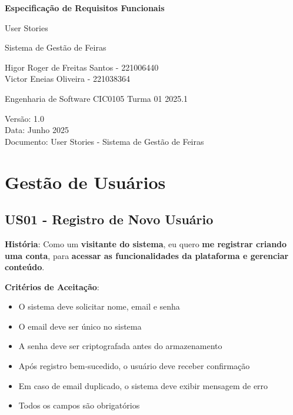 \documentclass[12pt,a4paper]{article}
\begin{document}
\begin{titlepage}
\centering
\vspace*{2cm}

{\Huge\bfseries Especificação de Requisitos Funcionais}

\vspace{0.5cm}

{\LARGE User Stories}

\vspace{0.5cm}

{\large Sistema de Gestão de Feiras}

\vspace{2cm}

{\large Higor Roger de Freitas Santos - 221006440\\
Victor Eneias Oliveira - 221038364}

\vspace{1cm}

{\large Engenharia de Software CIC0105 Turma 01 2025.1}

\vfill

{\large Versão: 1.0\\
Data: Junho 2025\\
Documento: User Stories - Sistema de Gestão de Feiras}

\end{titlepage}

\newpage
\tableofcontents
\newpage

\section{Gestão de Usuários}

\subsection{US01 - Registro de Novo Usuário}

\textbf{História}: Como um \textbf{visitante do sistema}, eu quero \textbf{me registrar criando uma conta}, para \textbf{acessar as funcionalidades da plataforma e gerenciar conteúdo}.

\textbf{Critérios de Aceitação}:
\begin{itemize}
    \item O sistema deve solicitar nome, email e senha
    \item O email deve ser único no sistema
    \item A senha deve ser criptografada antes do armazenamento
    \item Após registro bem-sucedido, o usuário deve receber confirmação
    \item Em caso de email duplicado, o sistema deve exibir mensagem de erro
    \item Todos os campos são obrigatórios
\end{itemize}
\end{document}
